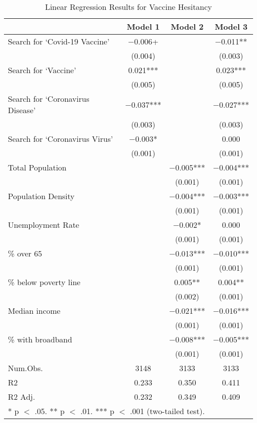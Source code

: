 \begin{table}[!h]

\caption{\label{tab:vacc_hes_analysis}Linear Regression Results for Vaccine Hesitancy}
\centering
\fontsize{8}{10}\selectfont

\begin{tabular}{lccc}
\toprule
  & Model 1 & Model 2 & Model 3\\
\midrule

Search for `Covid-19 Vaccine' & \num{-0.006}+ &  & \num{-0.011}**\\
 & (\num{0.004}) &  & (\num{0.003})\\
Search for `Vaccine' & \num{0.021}*** &  & \num{0.023}***\\
 & (\num{0.005}) &  & (\num{0.005})\\
Search for `Coronavirus Disease' & \num{-0.037}*** &  & \num{-0.027}***\\
 & (\num{0.003}) &  & (\num{0.003})\\
Search for `Coronavirus Virus' & \num{-0.003}* &  & \num{0.000}\\
 & (\num{0.001}) &  & (\num{0.001})\\
Total Population &  & \num{-0.005}*** & \num{-0.004}***\\
 &  & (\num{0.001}) & \vphantom{5} (\num{0.001})\\
Population Density &  & \num{-0.004}*** & \num{-0.003}***\\
 &  & (\num{0.001}) & \vphantom{4} (\num{0.001})\\
Unemployment Rate &  & \num{-0.002}* & \num{0.000}\\
 &  & (\num{0.001}) & \vphantom{3} (\num{0.001})\\
\% over 65 &  & \num{-0.013}*** & \num{-0.010}***\\
 &  & (\num{0.001}) & \vphantom{2} (\num{0.001})\\
\% below poverty line &  & \num{0.005}** & \num{0.004}**\\
 &  & (\num{0.002}) & (\num{0.001})\\
Median income &  & \num{-0.021}*** & \num{-0.016}***\\
 &  & (\num{0.001}) & \vphantom{1} (\num{0.001})\\
\% with broadband &  & \num{-0.008}*** & \num{-0.005}***\\
 &  & (\num{0.001}) & (\num{0.001})\\
\midrule
Num.Obs. & \num{3148} & \num{3133} & \num{3133}\\
R2 & \num{0.233} & \num{0.350} & \num{0.411}\\
R2 Adj. & \num{0.232} & \num{0.349} & \num{0.409}\\
\bottomrule
\multicolumn{4}{l}{\rule{0pt}{1em}* p $<$ .05. ** p $<$ .01. *** p $<$ .001 (two-tailed test).}\\
\end{tabular}
\end{table}